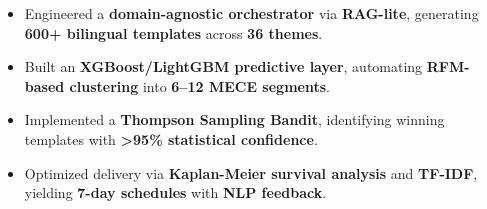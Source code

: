 \begin{itemize}
    \item Engineered a \textbf{domain-agnostic orchestrator} via \textbf{RAG-lite}, generating \textbf{600+ bilingual templates} across \textbf{36 themes}.
    \item Built an \textbf{XGBoost/LightGBM predictive layer}, automating \textbf{RFM-based clustering} into \textbf{6–12 MECE segments}.
    \item Implemented a \textbf{Thompson Sampling Bandit}, identifying winning templates with \textbf{>95\% statistical confidence}.
    \item Optimized delivery via \textbf{Kaplan-Meier survival analysis} and \textbf{TF-IDF}, yielding \textbf{7-day schedules} with \textbf{NLP feedback}.
\end{itemize}
